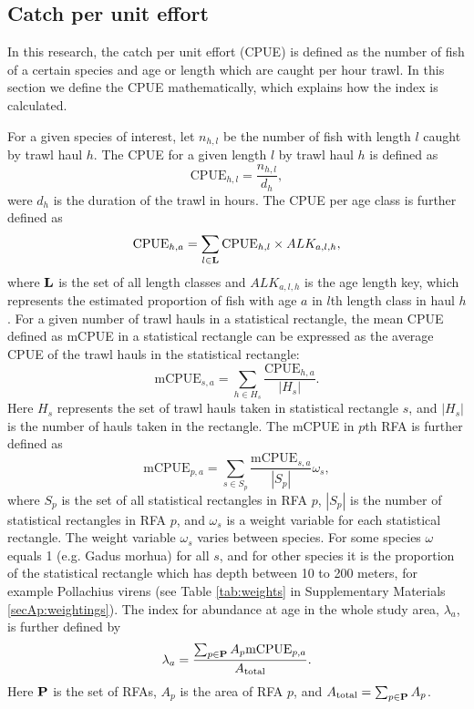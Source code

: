 \documentclass[a4paper 12pt]{article}
\numberwithin{equation}{section}
\begin{document}
\subsection{Catch per unit effort}
\label{sec:cpueestimators}
In this research, the catch per unit effort (CPUE) is defined as the number of fish of a certain species and age or length which are caught per hour trawl. In this section we define the CPUE mathematically, which explains how the index is calculated. 

For a given species of interest, let $n_{h,l}$ be the number of fish with length $l$ caught by trawl haul $h$. The CPUE for a given length $l$ by trawl haul $h$ is defined as 
\begin{equation}\label{eq:cpueHaul}
\mathrm{CPUE}_{h,l} =\frac{n_{h,l}}{d_h},
\end{equation}
were $d_h$ is the duration of the trawl in hours. The CPUE per age class is further defined as
\begin{equation}\label{eq:cpueALK}
\mathrm{CPUE}_{h,a} =\sum_{l \in {\bf L}}\mathrm{CPUE}_{h, l} \times ALK_{a,l,h},
\end{equation}
where ${\bf L}$ is the set of all length classes and $ALK_{a,l,h}$ is the age length key, which represents the estimated proportion of fish with age $a$ in $l$th length class in haul $h$. For a given number of trawl hauls in a statistical rectangle, the mean CPUE defined as  mCPUE  in a statistical rectangle can be expressed as the average CPUE of the trawl hauls in the statistical rectangle:
\begin{equation}\label{eq:cpueRec}
\mathrm{mCPUE}_{s,a} =\sum_{h \in H_{s}}\frac{\mathrm{CPUE}_{h,a}}{|H_{s}|}.
\end{equation}
Here $H_{s}$ represents the set of trawl hauls taken in statistical rectangle $s$, and $|H_{s}|$ is the number of hauls taken in the rectangle. The mCPUE in $p$th RFA is further defined as
\begin{equation}\label{eq:cpueRFA}
\mathrm{mCPUE}_{p,a} = \sum_{s \in S_{p}} \frac{\mathrm{mCPUE}_{s,a}}{|S_{p}|} \omega_s,
\end{equation}
where $S_{p}$ is the set of all statistical rectangles in RFA $p$, $|S_{p}|$ is the number of statistical rectangles in RFA $p$, and $\omega_s$ is a weight variable for each statistical rectangle. The weight variable $\omega_s$ varies between species. For some species $\omega$ equals 1 (e.g. Gadus morhua) for all $s$, and for other species it is the proportion of the statistical rectangle which has depth between 10 to 200 meters, for example Pollachius virens (see Table \ref{tab:weights} in Supplementary Materials \ref{secAp:weightings}).  The index for abundance at age in the whole study area, $\lambda_{a}$, is further defined by
\begin{equation}
\lambda_{a}= \frac{\sum_{p\in {\bf P}} A_{p}  \mathrm{mCPUE}_{p,a}}{A_{\text{total}}}.
\label{abundanceestimatornorthsea}
\end{equation}
Here ${\bf P}$ is the set of RFAs, $A_p$ is the area of RFA $p$, and $A_{\text{total}} = \sum_{p\in {\bf P}} A_{p}$.
\end{document}
